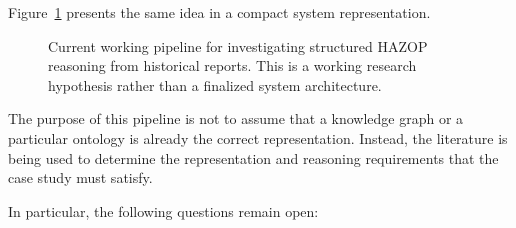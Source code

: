 Figure~\ref{fig:w3-working-pipeline} presents the same idea in a compact
system representation.

\begin{figure}[htbp]
\centering
{}
\caption[Current working research pipeline]
{Current working pipeline for investigating structured HAZOP reasoning from
historical reports. This is a working research hypothesis rather than a
finalized system architecture.}
\label{fig:w3-working-pipeline}
\end{figure}

The purpose of this pipeline is not to assume that a knowledge graph or a
particular ontology is already the correct representation. Instead, the
literature is being used to determine the representation and reasoning
requirements that the case study must satisfy.

In particular, the following questions remain open:

